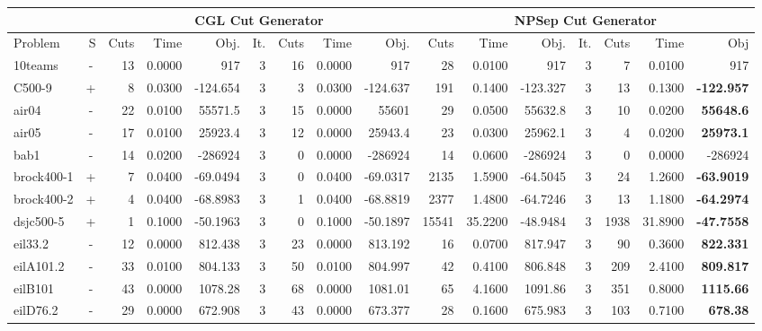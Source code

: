 \documentclass[a4paper]{article}
\begin{document}
\begin{sidewaystable}[h]\small 
\begin{tabular}{l|r|r|r|r|r|r|r|r|r|r|r|r|r|r|r}
\hline
        \multicolumn{2}{c|}{}   & \multicolumn{7}{c|}{CGL Cut Generator} & \multicolumn{7}{c}{NPSep Cut Generator} \\
\hline
Problem & S & Cuts & Time & Obj. & It. & Cuts & Time	& Obj. & Cuts & Time & Obj. & It. & Cuts & Time & Obj \\
\hline
\hline
10teams & \multicolumn{1}{c|}{ - } & 13 & 0.0000 & 917 & 3 & 16 & 0.0000 & 917 & 28 & 0.0100 & 917 & 3 & 7 & 0.0100 & 917 \\
C500-9 & \multicolumn{1}{c|}{ + } & 8 & 0.0300 & -124.654 & 3 & 3 & 0.0300 & -124.637 & 191 & 0.1400 & -123.327 & 3 & 13 & 0.1300 & \textbf{-122.957} \\
air04 & \multicolumn{1}{c|}{ - } & 22 & 0.0100 & 55571.5 & 3 & 15 & 0.0000 & 55601 & 29 & 0.0500 & 55632.8 & 3 & 10 & 0.0200 & \textbf{55648.6} \\
air05 & \multicolumn{1}{c|}{ - } & 17 & 0.0100 & 25923.4 & 3 & 12 & 0.0000 & 25943.4 & 23 & 0.0300 & 25962.1 & 3 & 4 & 0.0200 & \textbf{25973.1} \\
bab1 & \multicolumn{1}{c|}{ - } & 14 & 0.0200 & -286924 & 3 & 0 & 0.0000 & -286924 & 14 & 0.0600 & -286924 & 3 & 0 & 0.0000 & -286924 \\
brock400-1 & \multicolumn{1}{c|}{ + } & 7 & 0.0400 & -69.0494 & 3 & 0 & 0.0400 & -69.0317 & 2135 & 1.5900 & -64.5045 & 3 & 24 & 1.2600 & \textbf{-63.9019} \\
brock400-2 & \multicolumn{1}{c|}{ + } & 4 & 0.0400 & -68.8983 & 3 & 1 & 0.0400 & -68.8819 & 2377 & 1.4800 & -64.7246 & 3 & 13 & 1.1800 & \textbf{-64.2974} \\
dsjc500-5 & \multicolumn{1}{c|}{ + } & 1 & 0.1000 & -50.1963 & 3 & 0 & 0.1000 & -50.1897 & 15541 & 35.2200 & -48.9484 & 3 & 1938 & 31.8900 & \textbf{-47.7558} \\
eil33.2 & \multicolumn{1}{c|}{ - } & 12 & 0.0000 & 812.438 & 3 & 23 & 0.0000 & 813.192 & 16 & 0.0700 & 817.947 & 3 & 90 & 0.3600 & \textbf{822.331} \\
eilA101.2 & \multicolumn{1}{c|}{ - } & 33 & 0.0100 & 804.133 & 3 & 50 & 0.0100 & 804.997 & 42 & 0.4100 & 806.848 & 3 & 209 & 2.4100 & \textbf{809.817} \\
eilB101 & \multicolumn{1}{c|}{ - } & 43 & 0.0000 & 1078.28 & 3 & 68 & 0.0000 & 1081.01 & 65 & 4.1600 & 1091.86 & 3 & 351 & 0.8000 & \textbf{1115.66} \\
eilD76.2 & \multicolumn{1}{c|}{ - } & 29 & 0.0000 & 672.908 & 3 & 43 & 0.0000 & 673.377 & 28 & 0.1600 & 675.983 & 3 & 103 & 0.7100 & \textbf{678.38} \\

\end{tabular}
\end{sidewaystable}
\end{document}
